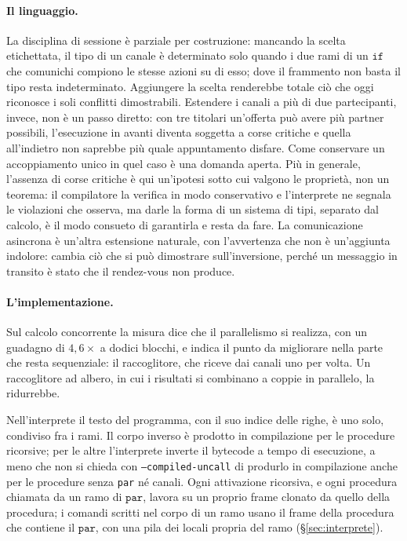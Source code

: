 \paragraph{Il linguaggio.} La disciplina di sessione è parziale per costruzione:
mancando la scelta etichettata, il tipo di un canale è determinato solo quando
i due rami di un $\mathtt{if}$ che comunichi compiono le stesse azioni su di
esso; dove il frammento non basta il tipo resta indeterminato. Aggiungere la scelta renderebbe totale ciò che oggi
riconosce i soli conflitti dimostrabili. Estendere i canali a più di due
partecipanti, invece, non è un passo diretto: con tre titolari un'offerta può
avere più partner possibili, l'esecuzione in avanti diventa soggetta a corse
critiche e quella all'indietro non saprebbe più quale appuntamento disfare.
Come conservare un accoppiamento unico in quel caso è una domanda aperta. Più in
generale, l'assenza di
corse critiche è qui un'ipotesi sotto cui valgono le proprietà, non un teorema:
il compilatore la verifica in modo conservativo e l'interprete ne segnala le
violazioni che osserva, ma darle la forma di un sistema di
tipi, separato dal calcolo, è il modo consueto di garantirla e resta da fare. La comunicazione asincrona è un'altra estensione
naturale, con l'avvertenza che non è un'aggiunta indolore: cambia ciò che si
può dimostrare sull'inversione, perché un messaggio in transito è stato che il
rendez-vous non produce.

\paragraph{L'implementazione.} Sul calcolo concorrente la misura dice che il
parallelismo si realizza, con un guadagno di $4{,}6\times$ a dodici blocchi, e
indica il punto da migliorare nella parte che resta sequenziale: il raccoglitore,
che riceve dai canali uno per volta. Un raccoglitore ad albero, in cui i
risultati si combinano a coppie in parallelo, la ridurrebbe.

Nell'interprete il testo del programma, con il suo indice delle righe, è uno
solo, condiviso fra i rami. Il corpo inverso è prodotto in compilazione per le
procedure ricorsive; per le altre l'interprete inverte il bytecode a tempo di
esecuzione, a meno che non si chieda con \texttt{--compiled-uncall} di
produrlo in compilazione anche per le procedure senza \texttt{par} né canali. Ogni attivazione
ricorsiva, e ogni procedura chiamata da un ramo di $\mathtt{par}$, lavora su un
proprio frame clonato da quello della procedura; i comandi scritti nel corpo
di un ramo usano il frame della procedura che contiene il $\mathtt{par}$, con
una pila dei locali propria del ramo (\S\ref{sec:interprete}).

